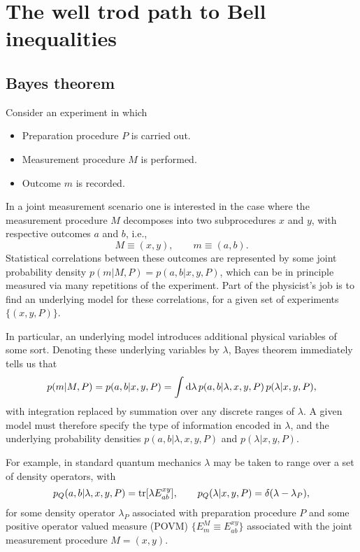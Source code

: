 \documentclass[graybox]{svmult}
\begin{document}
\section{The well trod path to Bell inequalities}
\label{2}

\subsection{Bayes theorem}

Consider an experiment in which
\begin{itemize}
	\item Preparation procedure $P$ is carried out.
	\item Measurement procedure $M$ is performed.
	\item Outcome $m$ is recorded.
\end{itemize}
 In a joint measurement scenario one is interested in the case where the measurement procedure $M$ decomposes into two subprocedures $x$ and $y$, with respective outcomes $a$ and  $b$, i.e., 
 \[ M\equiv (x,y),\qquad m\equiv (a,b) . \] 
Statistical correlations between these outcomes are represented by some joint probability density $p(m|M,P)=p(a,b|x,y,P)$, which can be in principle measured via many repetitions of the experiment. Part of the physicist's job is to find an underlying model for these correlations, for a given set of experiments $\{(x,y,P)\}$.  

In particular, an underlying model introduces additional physical variables of some sort.  Denoting these underlying variables by $\lambda$,  Bayes theorem immediately tells us that
\begin{equation} \label{bayes}
p(m|M,P)=p(a,b|x,y,P) = \int \D\lambda \,p(a,b|\lambda,x,y,P) \, p(\lambda|x,y,P) ,
\end{equation}
with integration replaced by summation over any discrete ranges of $\lambda$.  A given model must therefore specify the type of information encoded in $\lambda$, and the underlying probability densities $p(a,b|\lambda,x,y,P)$ and $p(\lambda|x,y,P)$.

For example, in standard quantum mechanics $\lambda$ may be taken to range over a set of density operators, with
\begin{equation} \label{qm}
 p_Q(a,b|\lambda,x,y,P)={\rm tr}[\lambda E^{xy}_{ab}] ,\qquad p_Q(\lambda|x,y,P)=\delta(\lambda-\lambda_P),
\end{equation}
for some density operator $\lambda_P$ associated with preparation procedure $P$ and some positive operator valued measure (POVM) $\{E^M_m\equiv E^{xy}_{ab}\}$ associated with the joint measurement procedure $M=(x,y)$.
\end{document}
